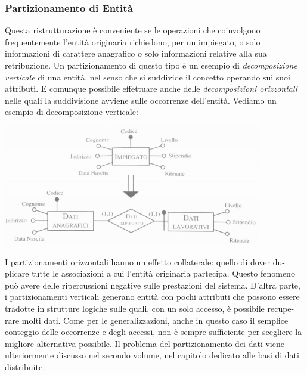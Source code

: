 \documentclass[a4paper,12pt, oneside]{book}
\begin{document}
\subsubsection{Partizionamento di Entità}
Questa ristrutturazione è conveniente se le operazioni che coinvolgono frequentemente l'entità originaria
richiedono, per un impiegato, o solo informazioni di carattere anagrafico o solo
informazioni relative alla sua retribuzione. Un partizionamento di questo tipo è un esempio di\textit{ decomposizione
verticale} di una entità, nel senso che si suddivide il concetto operando sui suoi attributi. E comunque possibile effettuare anche delle\textit{ decomposizioni
orizzontali} nelle quali la suddivisione avviene sulle occorrenze dell'entità. Vediamo un esempio di decomposizione verticale:
\begin{center}
\includegraphics[scale=1]{img/conc.png}
\end{center}
I partizionamenti orizzontali hanno un effetto collaterale: quello di dover du-
plicare tutte le associazioni a cui l'entità originaria partecipa. Questo fenomeno
può avere delle ripercussioni negative sulle prestazioni del sistema. D'altra parte,
i partizionamenti verticali generano entità con pochi attributi che possono essere
tradotte in strutture logiche sulle quali, con un solo accesso, è possibile recupe-
rare molti dati. Come per le generalizzazioni, anche in questo caso il semplice
conteggio delle occorrenze e degli accessi, non è sempre sufficiente per scegliere
la migliore alternativa possibile. Il problema del partizionamento dei dati viene
ulteriormente discusso nel secondo volume, nel capitolo dedicato alle basi di dati
distribuite.
\end{document}
